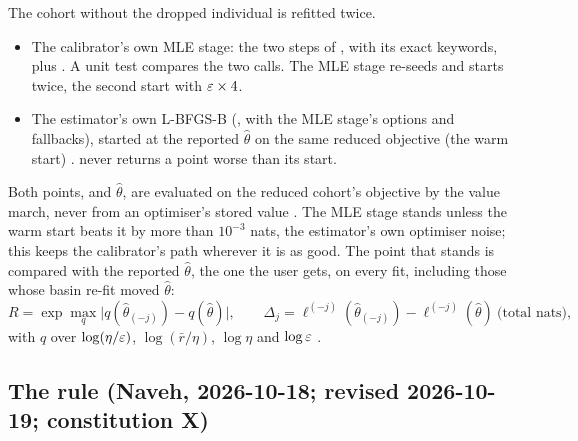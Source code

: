 The cohort without the dropped individual is refitted twice.
\begin{itemize}[nosep]
  \item The calibrator's own MLE stage: the two steps of , with its exact keywords,
    plus  . A unit test compares the two calls. The MLE stage
    re-seeds and starts twice, the second start with $\varepsilon\times4$.
  \item The estimator's own L-BFGS-B (, with the MLE stage's options and fallbacks), started at
    the reported $\hat\theta$ on the same reduced objective (the warm start) .
     never returns a point worse than its start.
\end{itemize}
Both points, and $\hat\theta$, are evaluated on the reduced cohort's objective by the value march, never from an
optimiser's stored value . The MLE stage stands unless the warm start beats it by more
than $10^{-3}$ nats, the estimator's own optimiser noise; this keeps the calibrator's path wherever it is as good. The
point that stands is compared with the reported $\hat\theta$, the one the user gets, on every fit, including those whose
basin re-fit moved $\hat\theta$:
\begin{equation}
  R=\exp\max_{q}\bigl|q(\hat\theta_{(-j)})-q(\hat\theta)\bigr|,\qquad
  \Delta_j=\ell^{(-j)}(\hat\theta_{(-j)})-\ell^{(-j)}(\hat\theta)\ \text{(total nats)},
\end{equation}
with $q$ over $\log(\eta/\varepsilon)$, $\log(\bar r/\eta)$, $\log\eta$ and $\log\varepsilon$ .

\subsection{The rule (Naveh, 2026-10-18; revised 2026-10-19; constitution X)}\label{sec:lev-rule}

